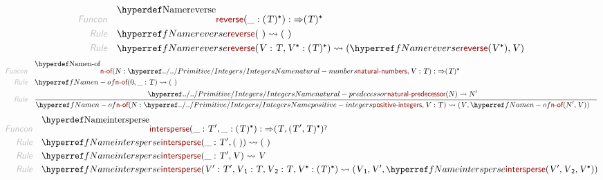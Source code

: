\begin{align*}
  \KEY{Funcon} \quad
  & \NAMEDECL{reverse}(
                       \_ : (  \VAR{T} )\STAR) 
    :  \TO (  \VAR{T} )\STAR 
\\
  \KEY{Rule} \quad
    & \NAMEREF{reverse}
        (   \  ) \leadsto 
        (   \  )
\\
  \KEY{Rule} \quad
    & \NAMEREF{reverse}
        (  \VAR{V} : \VAR{T}, 
               \VAR{V}\STAR : (  \VAR{T} )\STAR ) \leadsto 
        (  \NAMEREF{reverse}
                (  \VAR{V}\STAR ), 
               \VAR{V} )
\end{align*}
\begin{align*}
  \KEY{Funcon} \quad
  & \NAMEDECL{n-of}(
                       \VAR{N} : \NAMEHYPER{../../Primitive}{Integers}{natural-numbers}, \VAR{V} : \VAR{T}) 
    :  \TO (  \VAR{T} )\STAR 
\\
  \KEY{Rule} \quad
    & \NAMEREF{n-of}
        (  0, 
               \_ : \VAR{T} ) \leadsto 
        (   \  )
\\
  \KEY{Rule} \quad
    & \RULE{
      & \NAMEHYPER{../../Primitive}{Integers}{natural-predecessor}
          (  \VAR{N} ) \leadsto 
          \VAR{N}'
      }{
      & \NAMEREF{n-of}
          (  \VAR{N} : \NAMEHYPER{../../Primitive}{Integers}{positive-integers}, 
                 \VAR{V} : \VAR{T} ) \leadsto 
          (  \VAR{V}, 
                 \NAMEREF{n-of}
                  (  \VAR{N}', 
                         \VAR{V} ) )
      }
\end{align*}
\begin{align*}
  \KEY{Funcon} \quad
  & \NAMEDECL{intersperse}(
                       \_ : \VAR{T}', \_ : (  \VAR{T} )\STAR) 
    :  \TO (  \VAR{T}, 
                          (  \VAR{T}', 
                                \VAR{T} )\STAR )\QUERY 
\\
  \KEY{Rule} \quad
    & \NAMEREF{intersperse}
        (  \_ : \VAR{T}', 
               (   \  ) ) \leadsto 
        (   \  )
\\
  \KEY{Rule} \quad
    & \NAMEREF{intersperse}
        (  \_ : \VAR{T}', 
               \VAR{V} ) \leadsto 
        \VAR{V}
\\
  \KEY{Rule} \quad
    & \NAMEREF{intersperse}
        (  \VAR{V}' : \VAR{T}', 
               \VAR{V}\SUB{1} : \VAR{T}, 
               \VAR{V}\SUB{2} : \VAR{T}, 
               \VAR{V}\STAR : (  \VAR{T} )\STAR ) \leadsto 
        (  \VAR{V}\SUB{1}, 
               \VAR{V}', 
               \NAMEREF{intersperse}
                (  \VAR{V}', 
                       \VAR{V}\SUB{2}, 
                       \VAR{V}\STAR ) )
\end{align*}


